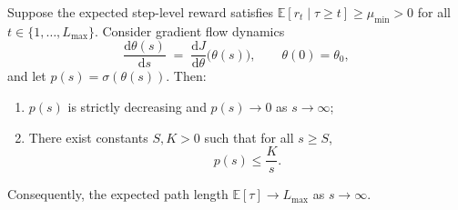 \documentclass{llmxive}
\begin{document}
\begin{theorem}\label{thm:collapse_formal}
Suppose the expected step-level reward satisfies $\mathbb{E}[r_t \mid \tau \geq t] \geq \mu_{\min} > 0$ for all $t \in \{1, \ldots, L_{\max}\}$. Consider gradient flow dynamics
\begin{equation}
    \frac{\mathrm{d}\theta(s)}{\mathrm{d}s} \;=\; \frac{\mathrm{d}J}{\mathrm{d}\theta}\bigl(\theta(s)\bigr),
    \qquad \theta(0)=\theta_0,
\end{equation}
and let $p(s)=\sigma(\theta(s))$. Then:
\begin{enumerate}
    \item $p(s)$ is strictly decreasing and $p(s) \to 0$ as $s \to \infty$;
    \item There exist constants $S, K > 0$ such that for all $s \geq S$,
    \begin{equation}
        p(s) \leq \frac{K}{s}.
    \end{equation}
\end{enumerate}
Consequently, the expected path length $\mathbb{E}[\tau] \to L_{\max}$ as $s \to \infty$.
\end{theorem}
\end{document}
